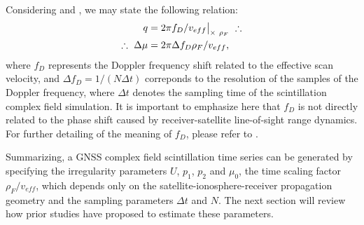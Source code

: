 Considering \cite[Equation 2-14]{harrington2001time} and \cite[The text before equation 26]{rinoCompactMultifrequencyGNSS2018}, we may state the following relation:
\begin{align}
    q &= 2 \pi f_D / v_{eff} \big|_{\times \ \rho_F} \ \therefore \notag \\
    \therefore \ \Delta \mu &= 2 \pi \Delta f_D \rho_F / v_{eff} \text{,}
\end{align}
where $f_D$ represents the Doppler frequency shift related to the effective scan velocity, and $\Delta f_D = 1/\left( N \Delta t \right)$ correponds to the resolution of the samples of the Doppler frequency, where $\Delta t$ denotes the sampling time of the scintillation complex field simulation. It is important to emphasize here that $f_D$ is not directly related to the phase shift caused by receiver-satellite line-of-sight range dynamics. For further detailing of the meaning of $f_D$, please refer to \cite[Text before equation 5]{carrano2017maximum}.

Summarizing, a GNSS complex field scintillation time series can be generated by specifying the irregularity parameters $U$, $p_1$, $p_2$ and $\mu_0$, the time scaling factor $\rho_F / v_{eff}$, which depends only on the satellite-ionosphere-receiver propagation geometry and the sampling parameters $\Delta t$ and $N$. The next section will review how prior studies have proposed to estimate these parameters.